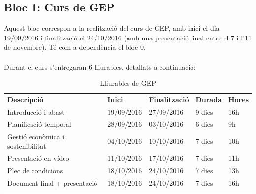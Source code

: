 	\subsection{Bloc 1: Curs de GEP}
		Aquest bloc correspon a la realització del curs de GEP, amb inici el dia 19/09/2016 i finalització el 24/10/2016 (amb una presentació final entre el 7 i l'11 de novembre).
		Té com a dependència el bloc 0.\\\\
		Durant el curs s'entregaran 6 lliurables, detallats a continuació:\\
		\begin{table}[H]
			\begin{center}
				\begin{tabular}{p{5cm} !{\vrule width -1pt}x{2.1cm} !{\vrule width -1pt}x{2.4cm} !{\vrule width -1pt}x{1.6cm} !{\vrule width -1pt}x{1.6cm}}
				\textbf{Descripció} & \textbf{Inici} & \textbf{Finalització} & \textbf{Durada} & \textbf{Hores} \\
				Introducció i abast & 19/09/2016 & 27/09/2016 & 9 dies & 16h \\
				Planificació temporal & 28/09/2016 & 03/10/2016 & 6 dies & 9h \\
				Gestió econòmica i sostenibilitat & 04/10/2016 & 10/10/2016 & 7 dies & 10h \\
				Presentació en vídeo & 11/10/2016 & 17/10/2016 & 7 dies & 11h \\
				Plec de condicions & 18/10/2016 & 24/10/2016 & 7 dies & 13h \\
				Document final + presentació & 18/10/2016 & 24/10/2016 & 7 dies & 16h
				\end{tabular}
			\end{center}
			\caption{Lliurables de GEP}
		\end{table}

